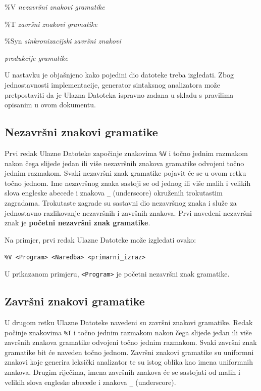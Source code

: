 \documentclass[times, 12pt, utf8]{book}
\begin{document}
\begin{description}
\itemsep 1pt
\item \%V \emph{nezavršni znakovi gramatike}
\item \%T \emph{završni znakovi gramatike}
\item \%Syn \emph{sinkronizacijski završni znakovi}
\item \emph{produkcije gramatike}
\end{description}

U nastavku je objašnjeno kako pojedini dio datoteke treba izgledati.
Zbog jednostavnosti implementacije, generator sintaksnog analizatora može pretpostaviti da je Ulazna Datoteka ispravno zadana u skladu s pravilima opisanim u ovom dokumentu.

\subsection{Nezavršni znakovi gramatike}

Prvi redak Ulazne Datoteke započinje znakovima \verb|%V| i točno jednim razmakom nakon čega slijede jedan ili više nezavršnih znakova gramatike odvojeni točno jednim razmakom.
Svaki nezavršni znak gramatike pojavit će se u ovom retku točno jednom.
Ime nezavršnog znaka sastoji se od jednog ili više malih i velikih slova engleske abecede i znakova \verb|_| (underscore) okruženih trokutastim zagradama.
Trokutaste zagrade su sastavni dio nezavršnog znaka i služe za jednostavno razlikovanje nezavršnih i završnih znakova.
Prvi navedeni nezavršni znak je \textbf{početni nezavršni znak gramatike}.

Na primjer, prvi redak Ulazne Datoteke može izgledati ovako:

\verb|%V <Program> <Naredba> <primarni_izraz>|

U prikazanom primjeru, \verb|<Program>| je početni nezavršni znak gramatike.

\subsection{Završni znakovi gramatike}

U drugom retku Ulazne Datoteke navedeni su završni znakovi gramatike.
Redak počinje znakovima \verb|%T| i točno jednim razmakom nakon čega slijede jedan ili više završnih znakova gramatike odvojeni točno jednim razmakom.
Svaki završni znak gramatike bit će naveden točno jednom.
Završni znakovi gramatike su uniformni znakovi koje generira leksički analizator te su istog oblika kao imena uniformnih znakova.
Drugim riječima, imena završnih znakova će se sastojati od malih i velikih slova engleske abecede i znakova \verb|_| (underscore).
\end{document}
